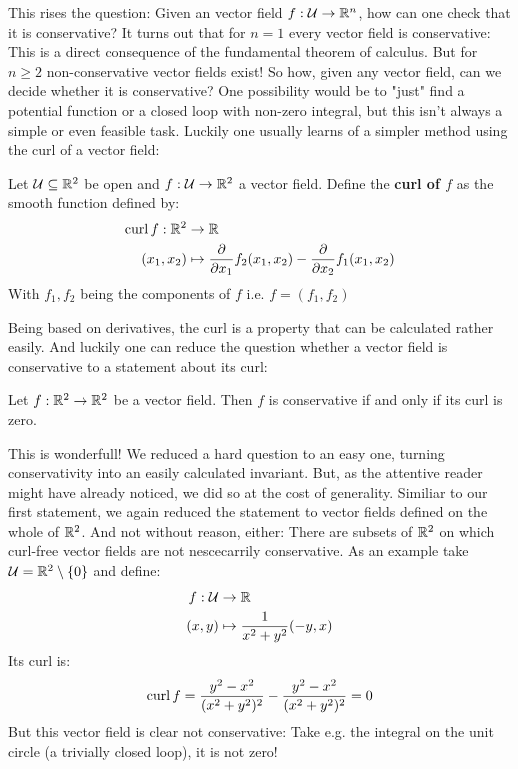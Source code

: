 This rises the question: Given an vector field $f: \mathcal{U} \to \mathbb{R}^n$, how can one check that it
is conservative? It turns out that for $n = 1$ every vector field is conservative: This is
a direct consequence of the fundamental theorem of calculus. But for $n \geq 2$ non-conservative vector
fields exist! So how, given any vector field, can we decide whether it is conservative? One possibility would
be to "just" find a potential function or a closed loop with non-zero integral, but this isn't always a simple
or even feasible task. Luckily one usually learns of a simpler method using the curl of a vector field:
\begin{definition}
	Let $\mathcal{U} \subseteq \mathbb{R}^2$ be open and $f: \mathcal{U} \to \mathbb{R}^2$ a vector field. Define the \textbf{curl of $f$} as
	the smooth function defined by:
	\begin{align*}
		\operatorname{curl} f: \mathbb{R}^2 &\to \mathbb{R} \\
		 (x_1, x_2)
			&\mapsto \frac{\partial}{\partial x_1} f_2(x_1, x_2) - \frac{\partial}{\partial x_2} f_1(x_1, x_2)
	\end{align*}
	With $f_1, f_2$ being the components of $f$ i.e. $f = (f_1, f_2)$
\end{definition}
Being based on derivatives, the curl is a property that can be calculated rather easily. And luckily one
can reduce the question whether a vector field is conservative to a statement about its curl:
\begin{lemma}
Let $f: \mathbb{R}^2 \to \mathbb{R}^2$ be a vector field. Then $f$ is conservative if and only if its curl is zero.
\end{lemma}

This is wonderfull! We reduced a hard question to an easy one, turning conservativity into an easily calculated
invariant. But, as the attentive reader might have already noticed, we did so at the cost of generality.
Similiar to our first statement, we again reduced the statement to vector fields defined on the whole of
$\mathbb{R}^2$. And not without reason, either: There are subsets of $\mathbb{R}^2$ on which curl-free vector fields are
not nescecarrily conservative. As an example take $\mathcal{U} = \mathbb{R}^2 \setminus \{0\}$ and define:
\begin{align*}
	f: \mathcal{U} &\to \mathbb{R} \\
		(x, y) &\mapsto \frac{1}{x^2 + y^2}(-y, x)
\end{align*}
Its curl is:
\begin{align*}
	\operatorname{curl} f = \frac{y^2 - x^2}{(x^2 + y^2)^2} - \frac{y^2 - x^2}{(x^2 + y^2)^2} = 0
\end{align*}
But this vector field is clear not conservative: Take e.g. the integral on the unit circle (a trivially closed
loop), it is not zero!


